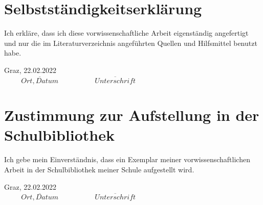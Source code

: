 {}
\chapter*{Selbstständigkeitserklärung}
Ich erkläre, dass ich diese vorwissenschaftliche Arbeit eigenständig angefertigt und nur die im Literaturverzeichnis angeführten Quellen und Hilfsmittel benutzt habe.

\vspace{2cm}

\hspace{0.2cm}\large Graz, 22.02.2022\\\small
$\overline{\hspace{1cm}Ort, Datum\hspace{1cm}}$ \hfill $\overline{\hspace{1cm}Unterschrift\hspace{1cm}}$

\vspace{1.5cm}

\hrulefill

{\let\clearpage\relax \chapter*{Zustimmung zur Aufstellung in der Schulbibliothek}}
Ich gebe mein Einverständnis, dass ein Exemplar meiner vorwissenschaftlichen Arbeit in der Schulbibliothek meiner Schule aufgestellt wird.

\vspace{2cm}

\hspace{0.2cm}\large Graz, 22.02.2022\\\small
$\overline{\hspace{1cm}Ort, Datum\hspace{1cm}}$ \hfill $\overline{\hspace{1cm}Unterschrift\hspace{1cm}}$




